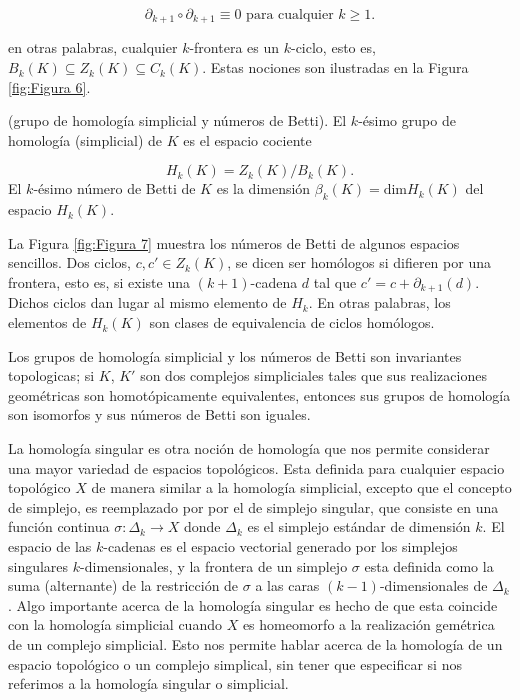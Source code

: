\begin{equation*}
    \partial_{k+1}\circ\partial_{k+1}\equiv 0 \text{ para cualquier } k\geq 1.
\end{equation*}

\noindent en otras palabras, cualquier $k$-frontera es un $k$-ciclo, esto es,
$B_{k}\left(K\right)\subseteq Z_{k}\left(K\right)\subseteq C_{k}\left(K\right)$. Estas nociones son
ilustradas en la Figura \ref{fig:Figura 6}.

\begin{definicion}
    (grupo de homolog\'ia simplicial y n\'umeros de Betti). El $k$-\'esimo grupo de homolog\'ia
    (simplicial) de $K$ es el espacio cociente
    
    \begin{equation*}
        H_{k}\left(K\right)=Z_{k}\left(K\right)/B_{k}\left(K\right).
    \end{equation*}
    El $k$-\'esimo n\'umero de Betti de $K$ es la dimensi\'on $\beta_{k}\left(K\right)=
    \mathrm{dim}H_{k}\left(K\right)$ del espacio $H_{k}\left(K\right)$.
\end{definicion}

La Figura \ref{fig:Figura 7} muestra los n\'umeros de Betti de algunos espacios sencillos. Dos ciclos,
$c, c' \in Z_{k}\left(K\right)$, se dicen ser hom\'ologos si difieren por una frontera, esto es, si
existe una $\left(k+1\right)$-cadena $d$ tal que $c'=c+\partial_{k+1}\left(d\right)$. Dichos ciclos dan
lugar al mismo elemento de $H_{k}$. En otras palabras, los elementos de $H_{k}\left(K\right)$ son clases
de equivalencia de ciclos hom\'ologos.

Los grupos de homolog\'ia simplicial y los n\'umeros de Betti son invariantes topologicas; si $K$, $K'$
son dos complejos simpliciales tales que sus realizaciones geom\'etricas son homot\'opicamente
equivalentes, entonces sus grupos de homolog\'ia son isomorfos y sus n\'umeros de Betti son iguales.

La homolog\'ia singular es otra noci\'on de homolog\'ia que nos permite considerar una mayor variedad de
espacios topol\'ogicos. Esta definida para cualquier espacio topol\'ogico $X$ de manera similar a la
homolog\'ia simplicial, excepto que el concepto de simplejo, es reemplazado por por el de simplejo
singular, que consiste en una funci\'on continua $\sigma: \Delta_{k}\rightarrow X$ donde $\Delta_{k}$
es el simplejo est\'andar de dimensi\'on $k$. El espacio de las $k$-cadenas es el espacio
vectorial generado por los simplejos singulares $k$-dimensionales, y la frontera de un simplejo $\sigma$
esta definida como la suma (alternante) de la restricci\'on de $\sigma$ a las caras $(k-1)$-dimensionales
de $\Delta_{k}$. Algo importante acerca de la homolog\'ia singular es hecho de que esta coincide con
la homolog\'ia simplicial cuando $X$ es homeomorfo a la realizaci\'on gem\'etrica de un complejo
simplicial. Esto nos permite hablar acerca de la homolog\'ia de un espacio topol\'ogico o un complejo
simplical, sin tener que especificar si nos referimos a la homolog\'ia singular o simplicial.

